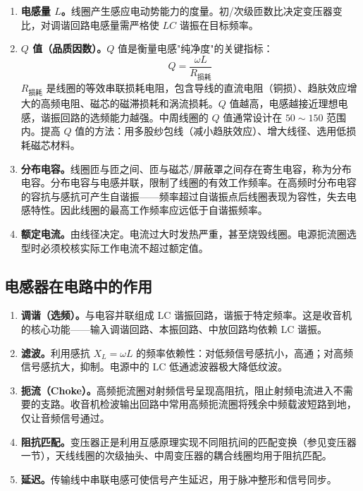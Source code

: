 \documentclass[12pt,UTF8]{ctexbook}
\begin{document}
\begin{enumerate}
\item \textbf{电感量 $L$。}线圈产生感应电动势能力的度量。初/次级匝数比决定变压器变比，对调谐回路电感量需严格使 $LC$ 谐振在目标频率。

\item \textbf{$Q$ 值（品质因数）。}$Q$ 值是衡量电感"纯净度"的关键指标：
\[
Q = \frac{\omega L}{R_{\text{损耗}}}
\]
$R_{\text{损耗}}$ 是线圈的等效串联损耗电阻，包含导线的直流电阻（铜损）、趋肤效应增大的高频电阻、磁芯的磁滞损耗和涡流损耗。$Q$ 值越高，电感越接近理想电感，谐振回路的选频能力越强。中周线圈的 $Q$ 值通常设计在 $50\sim150$ 范围内。提高 $Q$ 值的方法：用多股纱包线（减小趋肤效应）、增大线径、选用低损耗磁芯材料。

\item \textbf{分布电容。}线圈匝与匝之间、匝与磁芯/屏蔽罩之间存在寄生电容，称为分布电容。分布电容与电感并联，限制了线圈的有效工作频率。在高频时分布电容的容抗与感抗可产生自谐振——频率超过自谐振点后线圈表现为容性，失去电感特性。因此线圈的最高工作频率应远低于自谐振频率。

\item \textbf{额定电流。}由线径决定。电流过大时发热严重，甚至烧毁线圈。电源扼流圈选型时必须校核实际工作电流不超过额定值。
\end{enumerate}

\subsection{电感器在电路中的作用}

\begin{enumerate}
\item \textbf{调谐（选频）。}与电容并联组成 LC 谐振回路，谐振于特定频率。这是收音机的核心功能——输入调谐回路、本振回路、中放回路均依赖 LC 谐振。

\item \textbf{滤波。}利用感抗 $X_L = \omega L$ 的频率依赖性：对低频信号感抗小，高通；对高频信号感抗大，抑制。电源中的 LC 低通滤波器极大降低纹波。

\item \textbf{扼流（Choke）。}高频扼流圈对射频信号呈现高阻抗，阻止射频电流进入不需要的支路。收音机检波输出回路中常用高频扼流圈将残余中频载波短路到地，仅让音频信号通过。

\item \textbf{阻抗匹配。}变压器正是利用互感原理实现不同阻抗间的匹配变换（参见变压器一节），天线线圈的次级抽头、中周变压器的耦合线圈均用于阻抗匹配。

\item \textbf{延迟。}传输线中串联电感可使信号产生延迟，用于脉冲整形和信号同步。
\end{enumerate}
\end{document}
